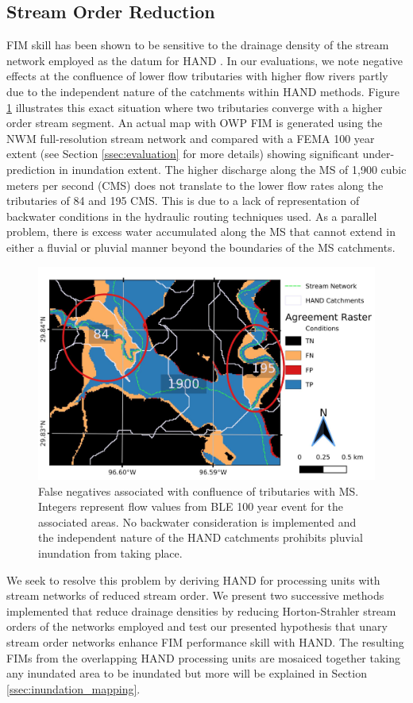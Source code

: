\documentclass[draft]{dependencies/agujournal2019}
\begin{document}
\subsection{Stream Order Reduction}
\label{ssec:stream_order_reduction}
%
FIM skill has been shown to be sensitive to the drainage density of the stream network employed as the datum for HAND \cite{zhang2018comparative,mcgehee2016modified,li2020evaluation,nobre2016hand}.
In our evaluations, we note negative effects at the confluence of lower flow tributaries with higher flow rivers partly due to the independent nature of the catchments within HAND methods.
Figure \ref{fig:catchment_boundaries_issue} illustrates this exact situation where two tributaries converge with a higher order stream segment. 
An actual map with OWP FIM is generated using the NWM full-resolution stream network and compared with a FEMA 100 year extent (see Section \ref{ssec:evaluation} for more details) showing significant under-prediction in inundation extent.
The higher discharge along the MS of 1,900 cubic meters per second (CMS) does not translate to the lower flow rates along the tributaries of 84 and 195 CMS. 
This is due to a lack of representation of backwater conditions in the hydraulic routing techniques used.
As a parallel problem, there is excess water accumulated along the MS that cannot extend in either a fluvial or pluvial manner beyond the boundaries of the MS catchments.
%
\begin{figure}[h!]
\centering
\includegraphics[scale=1.0]{figures/catchment_boundaries_issue.jpg}
\caption{False negatives associated with confluence of tributaries with MS. Integers represent flow values from BLE 100 year event for the associated areas. 
No backwater consideration is implemented and the independent nature of the HAND catchments prohibits pluvial inundation from taking place.}
\label{fig:catchment_boundaries_issue}
\end{figure}
%
We seek to resolve this problem by deriving HAND for processing units with stream networks of reduced stream order. 
We present two successive methods implemented that reduce drainage densities by reducing Horton-Strahler stream orders of the networks employed and test our presented hypothesis that unary stream order networks enhance FIM performance skill with HAND.
The resulting FIMs from the overlapping HAND processing units are mosaiced together taking any inundated area to be inundated but more will be explained in Section \ref{ssec:inundation_mapping}.
%
\end{document}
